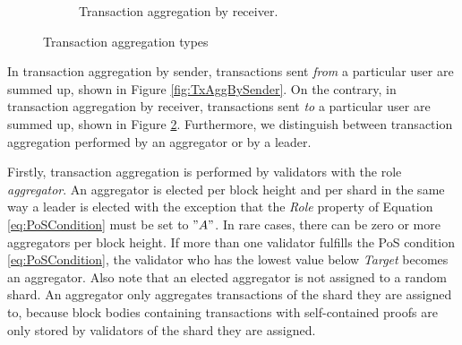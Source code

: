 \begin{figure}[hbt]
\begin{subfigure}[b]{0.9\textwidth}
  \caption{Transaction aggregation by receiver.\label{fig:TxAggByReceiver}}
\end{subfigure}
\caption{Transaction aggregation types}
\end{figure}

In transaction aggregation by sender, transactions sent \textit{from} a particular user are summed up, shown in Figure \ref{fig:TxAggBySender}. On the contrary, in transaction aggregation by receiver, transactions sent \textit{to} a particular user are summed up, shown in Figure \ref{fig:TxAggByReceiver}. Furthermore, we distinguish between transaction aggregation performed by an aggregator or by a leader.

Firstly, transaction aggregation is performed by validators with the role \textit{aggregator}. An aggregator is elected per block height and per shard in the same way a leader is elected with the exception that the \textit{Role} property of Equation \ref{eq:PoSCondition} must be set to $"A"$. In rare cases, there can be zero or more aggregators per block height. If more than one validator fulfills the PoS condition \ref{eq:PoSCondition}, the validator who has the lowest value below \textit{Target} becomes an aggregator. Also note that an elected aggregator is not assigned to a random shard. An aggregator only aggregates transactions of the shard they are assigned to, because block bodies containing transactions with self-contained proofs are only stored by validators of the shard they are assigned.

